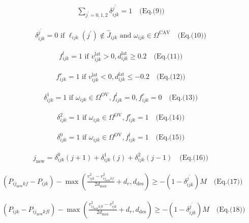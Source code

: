 \documentclass[10pt]{article}
\begin{document}
\[\begin{aligned}&\quad \sum_{j^{\prime}=0,1,2} \delta^{j^{\prime}}_{ijk} = 1 \quad \text{(Eq.(9))}\end{aligned}\]

\[\begin{aligned}&\quad \delta^{j^{\prime}}_{ijk} = 0 \text{ if } \ell_{ijk}(j^{\prime}) \notin \widehat J_{ijk} \text{ and } \omega_{ijk} \in \Omega^{\text{CAV}} \quad \text{(Eq.(10))}\end{aligned}\]

\[\begin{aligned}&\quad f^{l}_{ijk} = 1 \text{ if } v^{\text{lat}}_{ijk} > 0, d^{\text{lat}}_{ijk} \geq 0.2 \quad \text{(Eq.(11))}\end{aligned}\]

\[\begin{aligned}&\quad f^{r}_{ijk} = 1 \text{ if } v^{\text{lat}}_{ijk} < 0, d^{\text{lat}}_{ijk} \leq -0.2 \quad \text{(Eq.(12))}\end{aligned}\]

\[\begin{aligned}&\quad \delta^{1}_{ijk} = 1 \text{ if } \omega_{ijk} \in \Omega^{\text{OV}}, f^{l}_{ijk} = 0, f^{r}_{ijk} = 0 \quad \text{(Eq.(13))}\end{aligned}\]

\[\begin{aligned}&\quad \delta^{2}_{ijk} = 1 \text{ if } \omega_{ijk} \in \Omega^{\text{OV}}, f^{r}_{ijk} = 1 \quad \text{(Eq.(14))}\end{aligned}\]

\[\begin{aligned}&\quad \delta^{0}_{ijk} = 1 \text{ if } \omega_{ijk} \in \Omega^{\text{OV}}, f^{l}_{ijk} = 1 \quad \text{(Eq.(15))}\end{aligned}\]

\[\begin{aligned}&\quad j_{\text{new}} = \delta^{0}_{ijk}(j + 1) + \delta^{1}_{ijk}(j) + \delta^{2}_{ijk}(j - 1) \quad \text{(Eq.(16))}\end{aligned}\]

\[\begin{aligned}&\quad (P_{ij_{\text{new}}kf} - P_{ijk}) - \max \left( \frac{v^{2}_{ijk} - v^{2}_{ij_{\text{new}}kf}}{2d_{\max}} + d_{r}, d_{\text{des}} \right) \geq - (1 - \delta^{j^{\prime}}_{ijk}) M \quad \text{(Eq.(17))}\end{aligned}\]

\[\begin{aligned}&\quad (P_{ijk} - P_{ij_{\text{new}}kfl}) - \max \left( \frac{v^{2}_{ij_{\text{new}}kfl} - v^{2}_{ijk}}{2d_{\max}} + d_{r}, d_{\text{des}} \right) \geq - (1 - \delta^{j^{\prime}}_{ijk}) M \quad \text{(Eq.(18))}\end{aligned}\]
\end{document}
